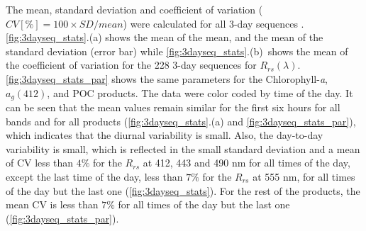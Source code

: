 \documentclass[onecolumn,3p,letterpaper,11pt]{elsarticle}
\begin{document}
The mean, standard deviation and coefficient of variation ($CV[\%]=100\times SD/mean$) were calculated for all 3-day sequences . \autoref{fig:3dayseq_stats}.(a) shows the mean of the mean, and the mean of the standard deviation (error bar) while \autoref{fig:3dayseq_stats}.(b)~shows the mean of the coefficient of variation for the 228 3-day sequences for $R_{rs}(\lambda)$. \autoref{fig:3dayseq_stats_par} shows the same parameters for the Chlorophyll-{\it a}, $a_g(412)$, and POC products. The data were color coded by time of the day. It can be seen that the mean values remain similar for the first six hours for all bands and for all products (\autoref{fig:3dayseq_stats}.(a) and \autoref{fig:3dayseq_stats_par}), which indicates that the diurnal variability is small. Also, the day-to-day variability is small, which is reflected in the small standard deviation and a mean of CV less than $4\%$ for the $R_{rs}$ at 412, 443 and 490 nm for all times of the day, except the last time of the day, less than $7\%$ for the $R_{rs}$ at 555 nm, for all times of the day but the last one (\autoref{fig:3dayseq_stats}). For the rest of the products, the mean CV is less than $7\%$ for all times of the day but the last one (\autoref{fig:3dayseq_stats_par}).
\end{document}

